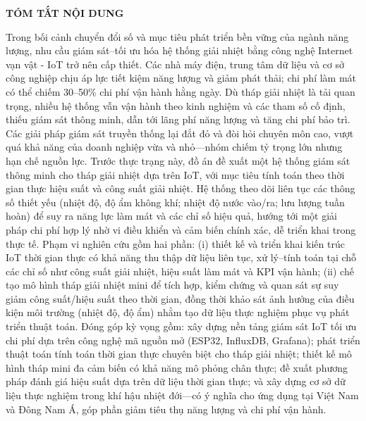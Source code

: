 \documentclass[../main.tex]{subfiles}
\begin{document}
\begin{center}
    \Large{\textbf{TÓM TẮT NỘI DUNG}}\\
\end{center}
\vspace{1cm}
Trong bối cảnh chuyển đổi số và mục tiêu phát triển bền vững của ngành năng lượng, nhu cầu giám sát–tối ưu hóa hệ thống giải nhiệt bằng công nghệ Internet vạn vật - IoT trở nên cấp thiết. Các nhà máy điện, trung tâm dữ liệu và cơ sở công nghiệp chịu áp lực tiết kiệm năng lượng và giảm phát thải; chi phí làm mát có thể chiếm 30–50\% chi phí vận hành hằng ngày. Dù tháp giải nhiệt là tải quan trọng, nhiều hệ thống vẫn vận hành theo kinh nghiệm và các tham số cố định, thiếu giám sát thông minh, dẫn tới lãng phí năng lượng và tăng chi phí bảo trì. Các giải pháp giám sát truyền thống lại đắt đỏ và đòi hỏi chuyên môn cao, vượt quá khả năng của doanh nghiệp vừa và nhỏ—nhóm chiếm tỷ trọng lớn nhưng hạn chế nguồn lực. Trước thực trạng này, đồ án đề xuất một hệ thống giám sát thông minh cho tháp giải nhiệt dựa trên IoT, với mục tiêu tính toán theo thời gian thực hiệu suất và công suất giải nhiệt. Hệ thống theo dõi liên tục các thông số thiết yếu (nhiệt độ, độ ẩm không khí; nhiệt độ nước vào/ra; lưu lượng tuần hoàn) để suy ra năng lực làm mát và các chỉ số hiệu quả, hướng tới một giải pháp chi phí hợp lý nhờ vi điều khiển và cảm biến chính xác, dễ triển khai trong thực tế. Phạm vi nghiên cứu gồm hai phần: (i) thiết kế và triển khai kiến trúc IoT thời gian thực có khả năng thu thập dữ liệu liên tục, xử lý–tính toán tại chỗ các chỉ số như công suất giải nhiệt, hiệu suất làm mát và KPI vận hành; (ii) chế tạo mô hình tháp giải nhiệt mini để tích hợp, kiểm chứng và quan sát sự suy giảm công suất/hiệu suất theo thời gian, đồng thời khảo sát ảnh hưởng của điều kiện môi trường (nhiệt độ, độ ẩm) nhằm tạo dữ liệu thực nghiệm phục vụ phát triển thuật toán. Đóng góp kỳ vọng gồm: xây dựng nền tảng giám sát IoT tối ưu chi phí dựa trên công nghệ mã nguồn mở (ESP32, InfluxDB, Grafana); phát triển thuật toán tính toán thời gian thực chuyên biệt cho tháp giải nhiệt; thiết kế mô hình tháp mini đa cảm biến có khả năng mô phỏng chân thực; đề xuất phương pháp đánh giá hiệu suất dựa trên dữ liệu thời gian thực; và xây dựng cơ sở dữ liệu thực nghiệm trong khí hậu nhiệt đới—có ý nghĩa cho ứng dụng tại Việt Nam và Đông Nam Á, góp phần giảm tiêu thụ năng lượng và chi phí vận hành.
\end{document}
